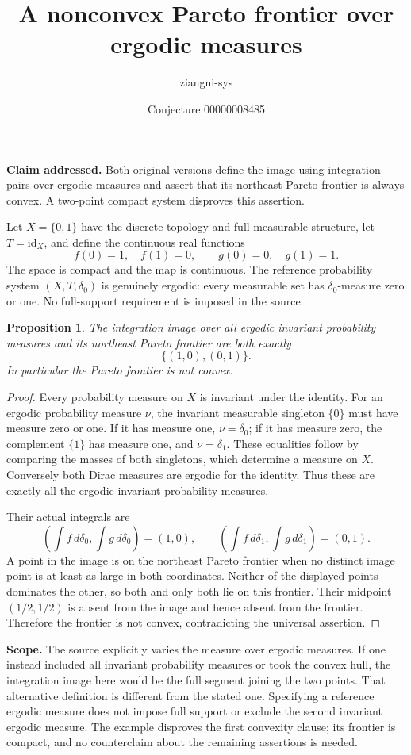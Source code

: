 \documentclass[11pt]{article}
\title{A nonconvex Pareto frontier over ergodic measures}
\author{ziangni-sys}
\date{Conjecture 00000008485}
\newtheorem{proposition}{Proposition}
\begin{document}
\maketitle
\noindent\textbf{Claim addressed.} Both original versions define the image using integration pairs over ergodic measures and assert that its northeast Pareto frontier is always convex. A two-point compact system disproves this assertion.

Let $X=\{0,1\}$ have the discrete topology and full measurable structure, let $T=\mathrm{id}_X$, and define the continuous real functions
\[
 f(0)=1,\quad f(1)=0,\qquad g(0)=0,\quad g(1)=1.
\]
The space is compact and the map is continuous. The reference probability system $(X,T,\delta_0)$ is genuinely ergodic: every measurable set has $\delta_0$-measure zero or one. No full-support requirement is imposed in the source.

\begin{proposition}
The integration image over all ergodic invariant probability measures and its northeast Pareto frontier are both exactly
\[
 \{(1,0),(0,1)\}.
\]
In particular the Pareto frontier is not convex.
\end{proposition}
\begin{proof}
Every probability measure on $X$ is invariant under the identity. For an ergodic probability measure $\nu$, the invariant measurable singleton $\{0\}$ must have measure zero or one. If it has measure one, $\nu=\delta_0$; if it has measure zero, the complement $\{1\}$ has measure one, and $\nu=\delta_1$. These equalities follow by comparing the masses of both singletons, which determine a measure on $X$. Conversely both Dirac measures are ergodic for the identity. Thus these are exactly all the ergodic invariant probability measures.

Their actual integrals are
\[
 \left(\int f\,d\delta_0,\int g\,d\delta_0\right)=(1,0),
 \qquad
 \left(\int f\,d\delta_1,\int g\,d\delta_1\right)=(0,1).
\]
A point in the image is on the northeast Pareto frontier when no distinct image point is at least as large in both coordinates. Neither of the displayed points dominates the other, so both and only both lie on this frontier. Their midpoint $(1/2,1/2)$ is absent from the image and hence absent from the frontier. Therefore the frontier is not convex, contradicting the universal assertion.
\end{proof}

\noindent\textbf{Scope.} The source explicitly varies the measure over ergodic measures. If one instead included all invariant probability measures or took the convex hull, the integration image here would be the full segment joining the two points. That alternative definition is different from the stated one. Specifying a reference ergodic measure does not impose full support or exclude the second invariant ergodic measure. The example disproves the first convexity clause; its frontier is compact, and no counterclaim about the remaining assertions is needed.
\end{document}
